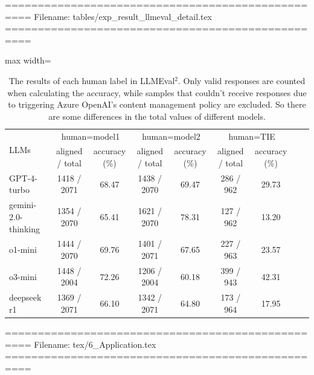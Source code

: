 ==================================================
Filename: tables/exp_result_llmeval_detail.tex
==================================================
\begin{table}[t]
    \small
    \centering
    \begin{adjustbox}{max width=\textwidth}
    \begin{tabular}{lcccccccc}
        \toprule
         \multirow{2}{*}{LLMs} & \multicolumn{2}{c}{human=model1} & \multicolumn{2}{c}{human=model2} & \multicolumn{2}{c}{human=TIE} \\
         & aligned / total & accuracy (\%) & aligned / total & accuracy (\%) & aligned / total & accuracy (\%) \\
        \midrule
        GPT-4-turbo & 1418 / 2071 & 68.47 & 1438 / 2070 & 69.47 & 286 / 962 & 29.73 \\
        
        gemini-2.0-thinking & 1354 / 2070 & 65.41 & 1621 / 2070 & 78.31 & 127 / 962 & 13.20 \\
        
        o1-mini & 1444 / 2070 & 69.76 & 1401 / 2071 & 67.65 & 227 / 963 & 23.57 \\

        o3-mini & 1448 / 2004 & 72.26 & 1206 / 2004 & 60.18 & 399 / 943 & 42.31 \\

        deepseek r1 & 1369 / 2071 & 66.10 & 1342 / 2071 & 64.80 & 173 / 964 & 17.95 \\
        \bottomrule
    \end{tabular}
    \end{adjustbox}
    \caption{The results of each human label in LLMEval$^2$. Only valid responses are counted when calculating the accuracy, while samples that couldn't receive responses due to triggering Azure OpenAI's content management policy are excluded. So there are some differences in the total values of different models.}
    \label{tb:exp_results_llmeval2_detail}
    \vspace{-20pt}
\end{table}


==================================================
Filename: tex/6_Application.tex
==================================================

